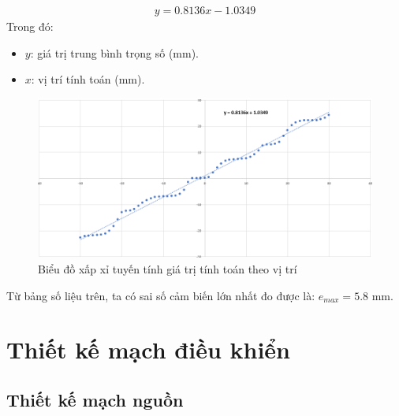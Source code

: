             \begin{align}
                y = 0.8136x - 1.0349
                \label{eq:4-8}
            \end{align}
            Trong đó:
            \begin{itemize}
                \item $y$: giá trị trung bình trọng số (mm).
                \item $x$: vị trí tính toán (mm).
            \end{itemize}
            \begin{figure}[H]
                \centering
                \includegraphics[width=1\textwidth]{pictures/chapter4/c4_p12_LinearRegression.png}
                \caption{Biểu đồ xấp xỉ tuyến tính giá trị tính toán theo vị trí}
                \label{fig:4-8}
            \end{figure}
            \hspace*{0.6cm}Từ bảng số liệu trên, ta có sai số cảm biến lớn nhất đo được là: $e_{max} = 5.8$ mm. \\
    \section{Thiết kế mạch điều khiển} 
        \subsection{Thiết kế mạch nguồn}
